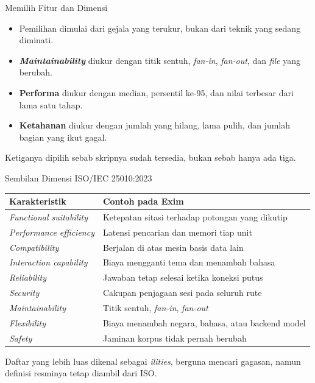 \documentclass[aspectratio=169, table, 12pt]{beamer}
\begin{document}
\begin{frame}{{\Large Memilih Fitur dan Dimensi}}
  \vspace{10pt}
  \begin{itemize}\small
    \item Pemilihan dimulai dari gejala yang terukur, bukan dari teknik yang
          sedang diminati.
    \item \textbf{\textit{Maintainability}} diukur dengan titik sentuh,
          \textit{fan-in}, \textit{fan-out}, dan \textit{file} yang berubah.
    \item \textbf{Performa} diukur dengan median, persentil ke-95, dan nilai
          terbesar dari lama satu tahap.
    \item \textbf{Ketahanan} diukur dengan jumlah yang hilang, lama pulih, dan
          jumlah bagian yang ikut gagal.
  \end{itemize}

  \vspace{6pt}
  {\small Ketiganya dipilih sebab skripnya sudah tersedia, bukan sebab hanya
  ada tiga.}
\end{frame}

\begin{frame}{{\Large Sembilan Dimensi ISO/IEC 25010:2023}}
  \vspace{4pt}
  \centering
  \scriptsize
  \begin{tabularx}{0.97\textwidth}{|l|X|}
    \hline
    \textbf{Karakteristik} & \textbf{Contoh pada Exim} \\
    \hline
    \textit{Functional suitability} & Ketepatan sitasi terhadap potongan yang dikutip \\
    \hline
    \textit{Performance efficiency} & Latensi pencarian dan memori tiap unit \\
    \hline
    \textit{Compatibility} & Berjalan di atas mesin basis data lain \\
    \hline
    \textit{Interaction capability} & Biaya mengganti tema dan menambah bahasa \\
    \hline
    \textit{Reliability} & Jawaban tetap selesai ketika koneksi putus \\
    \hline
    \textit{Security} & Cakupan penjagaan sesi pada seluruh rute \\
    \hline
    \textit{Maintainability} & Titik sentuh, \textit{fan-in}, \textit{fan-out} \\
    \hline
    \textit{Flexibility} & Biaya menambah negara, bahasa, atau backend model \\
    \hline
    \textit{Safety} & Jaminan korpus tidak pernah berubah \\
    \hline
  \end{tabularx}

  \vspace{4pt}
  \raggedright
  {\small Daftar yang lebih luas dikenal sebagai \textit{ilities}, berguna
  mencari gagasan, namun definisi resminya tetap diambil dari ISO.}
\end{frame}
\end{document}
